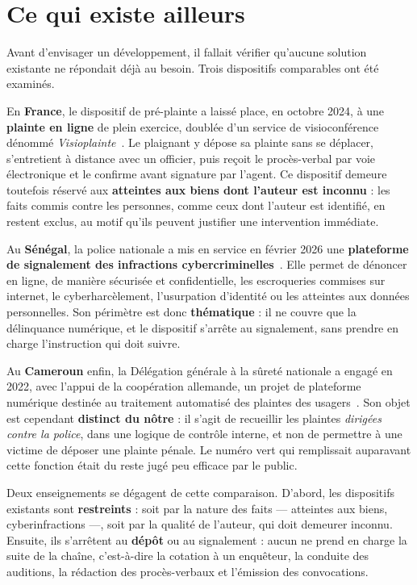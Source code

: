 \section{Ce qui existe ailleurs}

Avant d'envisager un développement, il fallait vérifier qu'aucune solution existante ne répondait déjà au besoin. Trois dispositifs comparables ont été examinés.

En \textbf{France}, le dispositif de pré-plainte a laissé place, en octobre 2024, à une \textbf{plainte en ligne} de plein exercice, doublée d'un service de visioconférence dénommé \textit{Visioplainte}~\cite{france:visioplainte}. Le plaignant y dépose sa plainte sans se déplacer, s'entretient à distance avec un officier, puis reçoit le procès-verbal par voie électronique et le confirme avant signature par l'agent. Ce dispositif demeure toutefois réservé aux \textbf{atteintes aux biens dont l'auteur est inconnu} : les faits commis contre les personnes, comme ceux dont l'auteur est identifié, en restent exclus, au motif qu'ils peuvent justifier une intervention immédiate.

Au \textbf{Sénégal}, la police nationale a mis en service en février 2026 une \textbf{plateforme de signalement des infractions cybercriminelles}~\cite{senegal:psic}. Elle permet de dénoncer en ligne, de manière sécurisée et confidentielle, les escroqueries commises sur internet, le cyberharcèlement, l'usurpation d'identité ou les atteintes aux données personnelles. Son périmètre est donc \textbf{thématique} : il ne couvre que la délinquance numérique, et le dispositif s'arrête au signalement, sans prendre en charge l'instruction qui doit suivre.

Au \textbf{Cameroun} enfin, la Délégation générale à la sûreté nationale a engagé en 2022, avec l'appui de la coopération allemande, un projet de plateforme numérique destinée au traitement automatisé des plaintes des usagers~\cite{cameroun:dgsngiz}. Son objet est cependant \textbf{distinct du nôtre} : il s'agit de recueillir les plaintes \emph{dirigées contre la police}, dans une logique de contrôle interne, et non de permettre à une victime de déposer une plainte pénale. Le numéro vert qui remplissait auparavant cette fonction était du reste jugé peu efficace par le public.

Deux enseignements se dégagent de cette comparaison. D'abord, les dispositifs existants sont \textbf{restreints} : soit par la nature des faits — atteintes aux biens, cyberinfractions —, soit par la qualité de l'auteur, qui doit demeurer inconnu. Ensuite, ils s'arrêtent au \textbf{dépôt} ou au signalement : aucun ne prend en charge la suite de la chaîne, c'est-à-dire la cotation à un enquêteur, la conduite des auditions, la rédaction des procès-verbaux et l'émission des convocations.

